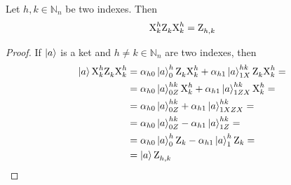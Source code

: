 \documentclass[sigconf,natbib=false]{acmart}
\begin{document}
	\begin{proposition}
		Let $h,k \in \mathbb{N}_n$ be two indexes.
		Then
		\begin{equation}
			\text{X}^{h}_{k}\text{Z}^{}_{k}\text{X}^{h}_{k} = \text{Z}^{}_{h,k}
		\end{equation}
	\end{proposition}
	\begin{proof}
		If $\ket{a}$ is a ket and $h\neq k\in \mathbb{N}_n$ are two indexes, then
		\begin{align*}
			\ket{a}\text{X}^{h}_{k}\text{Z}^{}_{k}\text{X}^{h}_{k}
			&=\alpha_{h0}\ket{a}^{h}_{0}\text{Z}^{}_{k}\text{X}^{h}_{k}+
			\alpha_{h1}\ket{a}^{hk}_{1X}\text{Z}^{}_{k}\text{X}^{h}_{k}=\\
			&=\alpha_{h0}\ket{a}^{hk}_{0Z}\text{X}^{h}_{k}+
			\alpha_{h1}\ket{a}^{hk}_{1ZX}\text{X}^{h}_{k}=\\
			&=\alpha_{h0}\ket{a}^{hk}_{0Z}+\alpha_{h1}\ket{a}^{hk}_{1XZX}=\\
			&=\alpha_{h0}\ket{a}^{hk}_{0Z}-\alpha_{h1}\ket{a}^{hk}_{1Z}=\\
			&=\alpha_{h0}\ket{a}^{h}_{0}\text{Z}_k-\alpha_{h1}\ket{a}^{h}_{1}\text{Z}_k=\\
			&=\ket{a}\text{Z}^{}_{h,k}
		\end{align*}
	\end{proof}
\end{document}
